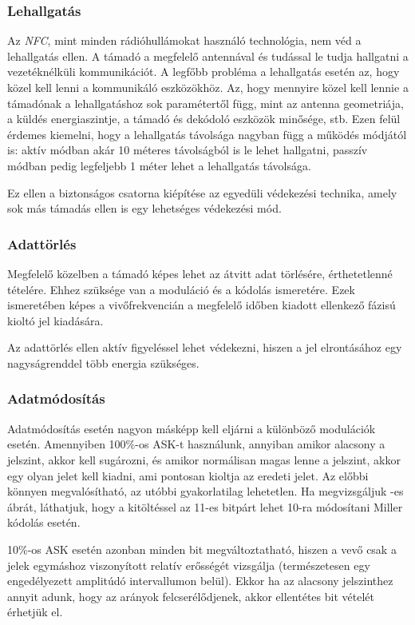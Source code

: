 \documentclass[12pt]{article}
\begin{document}
\subsubsection{Lehallgatás}
Az \emph{NFC}, mint minden rádióhullámokat használó technológia, nem véd a lehallgatás
ellen. A támadó a megfelelő antennával és tudással le tudja hallgatni a 
vezetéknélküli kommunikációt. A legfőbb probléma a lehallgatás esetén az, 
hogy közel kell lenni a kommunikáló eszközökhöz. Az, hogy mennyire közel kell
lennie a támadónak a lehallgatáshoz sok paramétertől függ, mint az antenna 
geometriája, a küldés energiaszintje, a támadó és dekódoló eszközök minősége, stb.
Ezen felül érdemes kiemelni, hogy a lehallgatás távolsága nagyban függ a működés
módjától is: aktív módban akár 10 méteres távolságból is le lehet hallgatni, 
passzív módban pedig legfeljebb 1 méter lehet a lehallgatás távolsága.

Ez ellen a biztonságos csatorna kiépítése az egyedüli védekezési technika, 
amely sok más támadás ellen is egy lehetséges védekezési mód.

\subsubsection{Adattörlés}
Megfelelő közelben a támadó képes lehet az átvitt adat törlésére, érthetetlenné
tételére. Ehhez szüksége van a moduláció és a kódolás ismeretére. Ezek ismeretében
képes a vivőfrekvencián a megfelelő időben kiadott ellenkező fázisú kioltó jel
kiadására. 

Az adattörlés ellen aktív figyeléssel lehet védekezni, hiszen a jel elrontásához
egy nagyságrenddel több energia szükséges.

\subsubsection{Adatmódosítás}
Adatmódosítás esetén nagyon másképp kell eljárni a különböző modulációk esetén.
Amennyiben 100\%-os ASK-t használunk, annyiban amikor alacsony a jelszint, akkor
kell sugározni, és amikor normálisan magas lenne a jelszint, akkor egy olyan 
jelet kell kiadni, ami pontosan kioltja az eredeti jelet. Az előbbi könnyen 
megvalósítható, az utóbbi gyakorlatilag lehetetlen. Ha megvizsgáljuk 
-es ábrát, láthatjuk, hogy a kitöltéssel az 11-es bitpárt
lehet 10-ra módosítani Miller kódolás esetén.

10\%-os ASK esetén azonban minden bit megváltoztatható, hiszen a vevő csak a 
jelek egymáshoz viszonyított relatív erősségét vizsgálja (természetesen egy
engedélyezett amplitúdó intervallumon belül). Ekkor ha az alacsony jelszinthez 
annyit adunk, hogy az arányok felcserélődjenek, akkor ellentétes bit vételét
érhetjük el.
\end{document}
